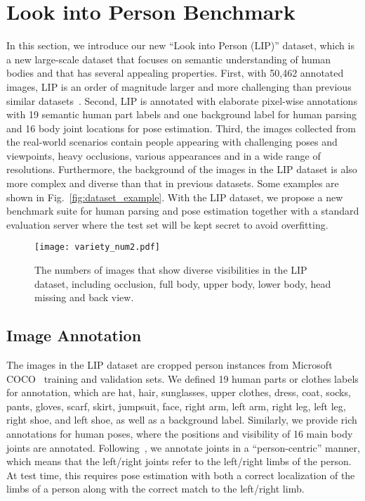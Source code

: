 \documentclass[10pt,journal,compsoc]{IEEEtran}
\begin{document}
\section{Look into Person Benchmark}
In this section, we introduce our new ``Look into Person (LIP)'' dataset, which is a new large-scale dataset that focuses on semantic understanding of human bodies and that has several appealing properties. First, with 50,462 annotated images, LIP is an order of magnitude larger and more challenging than previous similar datasets~\cite{yamaguchi2012parsing,chen2014detect,Co-CNN}. Second, LIP is annotated with elaborate pixel-wise annotations with 19 semantic human part labels and one background label for human parsing and 16 body joint locations for pose estimation. Third, the images collected from the real-world scenarios contain people appearing with challenging poses and viewpoints, heavy occlusions, various appearances and in a wide range of resolutions. Furthermore, the background of the images in the LIP dataset is also more complex and diverse than that in previous datasets. Some examples are shown in Fig.~\ref{fig:dataset_example}. With the LIP dataset, we propose a new benchmark suite for human parsing and pose estimation together with a standard evaluation server where the test set will be kept secret to avoid overfitting.


\begin{figure}[t]
\centering
   \texttt{[image: variety\_num2.pdf]}
\vspace{-8mm}
\caption{The numbers of images that show diverse visibilities in the LIP dataset, including occlusion, full body, upper body, lower body, head missing and back view.}
\vspace{-4mm}
\label{fig: dataset_analysis_factor}
\end{figure}

\subsection{Image Annotation}
The images in the LIP dataset are cropped person instances from Microsoft COCO~\cite{DBLP:journals/corr/LinMBHPRDZ14} training and validation sets. We defined 19 human parts or clothes labels for annotation, which are hat, hair, sunglasses, upper clothes, dress, coat, socks, pants, gloves, scarf, skirt, jumpsuit, face, right arm, left arm, right leg, left leg, right shoe, and left shoe, as well as a background label. Similarly, we provide rich annotations for human poses, where the positions and visibility of 16 main body joints are annotated. Following~\cite{andriluka14cvpr}, we annotate joints in a ``person-centric'' manner, which means that the left/right joints refer to the left/right limbs of the person. At test time, this requires pose estimation with both a correct localization of the limbs of a person along with the correct match to the left/right limb.
\end{document}
